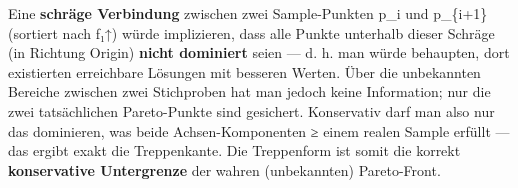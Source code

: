 \documentclass[11pt, a4paper]{article}
\begin{document}
Eine \textbf{schräge Verbindung} zwischen zwei Sample-Punkten p\_i und p\_\{i+1\} (sortiert nach f₁↑) würde implizieren, dass alle Punkte unterhalb dieser Schräge (in Richtung Origin) \textbf{nicht dominiert} seien — d. h. man würde behaupten, dort existierten erreichbare Lösungen mit besseren Werten. Über die unbekannten Bereiche zwischen zwei Stichproben hat man jedoch keine Information; nur die zwei tatsächlichen Pareto-Punkte sind gesichert. Konservativ darf man also nur das dominieren, was beide Achsen-Komponenten ≥ einem realen Sample erfüllt — das ergibt exakt die Treppenkante. Die Treppenform ist somit die korrekt \textbf{konservative Untergrenze} der wahren (unbekannten) Pareto-Front.





\end{document}
